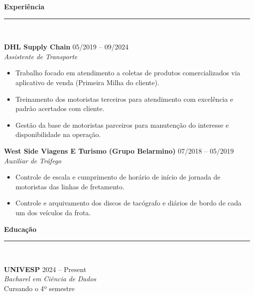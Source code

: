 \documentclass[10pt,a4paper]{article}
\begin{document}
\begin{minipage}[t]{0.63\textwidth}
    \raggedright
    
    {\color{primarycolor}\large \textbf{Experiência}} \\
    \rule{\linewidth}{0.5pt} \\
    \vspace{2mm}
    
            \textbf{DHL Supply Chain} \hfill \small 05/2019 -- 09/2024 \\
        \textit{\small Assistente de Transporte}
        \begin{itemize}
                                        \item \small Trabalho focado em atendimento a coletas de produtos comercializados via aplicativo de venda (Primeira Milha do cliente).
                            \item \small Treinamento dos motoristas terceiros para atendimento com excelência e padrão acertados com cliente.
                            \item \small Gestão da base de motoristas parceiros para manutenção do interesse e disponibilidade na operação.
                    \end{itemize}
        \vspace{2mm}
            \textbf{West Side Viagens E Turismo (Grupo Belarmino)} \hfill \small 07/2018 -- 05/2019 \\
        \textit{\small Auxiliar de Tráfego}
        \begin{itemize}
                                        \item \small Controle de escala e cumprimento de horário de início de jornada de motoristas das linhas de fretamento.
                            \item \small Controle e arquivamento dos discos de tacógrafo e diários de bordo de cada um dos veículos da frota.
                    \end{itemize}
        \vspace{2mm}
        
    \vspace{3mm}
    
    {\color{primarycolor}\large \textbf{Educação}} \\
    \rule{\linewidth}{0.5pt} \\
    \vspace{2mm}
    
            \textbf{UNIVESP} \hfill \small 2024 -- Present \\
        \textit{\small Bacharel em Ciência de Dados} \\
        \small Cursando o 4º semestre \\
        \vspace{2mm}
    \end{minipage}
\end{document}
